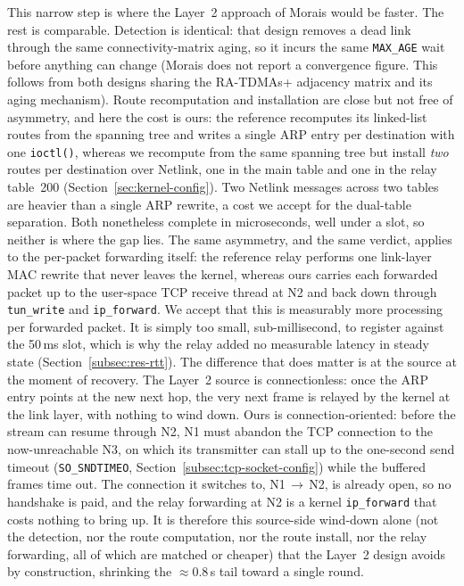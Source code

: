 This narrow step is where the Layer~2 approach of Morais would be faster. The
rest is comparable.
Detection is identical: that design removes a dead link through the same
connectivity-matrix aging, so it incurs the same \texttt{MAX\_AGE} wait before
anything can change (Morais does not report a convergence figure. This follows
from both designs sharing the RA-TDMAs+ adjacency matrix and its aging
mechanism). Route recomputation and installation are close but not free of
asymmetry, and here the cost is ours: the reference recomputes its linked-list
routes from the spanning tree and writes a single ARP entry per destination with
one \texttt{ioctl()}, whereas we recompute from the same spanning tree but
install \emph{two} routes per destination over Netlink, one in the main table
and one in the relay table~200 (Section~\ref{sec:kernel-config}). Two Netlink
messages across two tables are heavier than a single ARP rewrite, a cost we
accept for the dual-table separation. Both nonetheless complete in microseconds,
well under a slot, so neither is where the gap lies. The same asymmetry, and the same verdict,
applies to the per-packet forwarding itself: the reference relay performs one
link-layer MAC rewrite that never leaves the kernel, whereas ours carries each
forwarded packet up to the user-space TCP receive thread at N2 and back down
through \texttt{tun\_write} and \texttt{ip\_forward}. We accept that this is
measurably more processing per forwarded packet. It is simply too small,
sub-millisecond, to register against the 50\,ms slot, which is why the relay
added no measurable latency in steady state (Section~\ref{subsec:res-rtt}). The
difference that does matter is at the source at the moment of recovery. The
Layer~2 source is connectionless: once the ARP entry points at the new next
hop, the very next frame is relayed by the kernel at the link layer, with
nothing to wind down. Ours is connection-oriented: before the stream can resume
through N2, N1 must abandon the TCP connection to the now-unreachable N3, on
which its transmitter can stall up to the one-second send timeout
(\texttt{SO\_SNDTIMEO}, Section~\ref{subsec:tcp-socket-config}) while the
buffered frames time out. The connection it switches to, N1\,$\to$\,N2, is
already open, so no handshake is paid, and the relay forwarding at N2 is a
kernel \texttt{ip\_forward} that costs nothing to bring up. It is therefore this
source-side wind-down alone (not the detection, nor the route computation, nor
the route install, nor the relay forwarding, all of which are matched or
cheaper) that the Layer~2 design avoids by construction, shrinking the
$\approx 0.8$\,s tail toward a single round.

